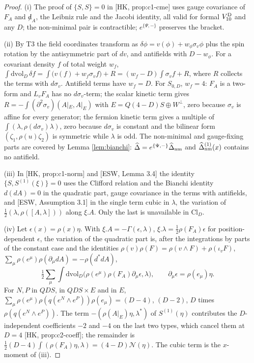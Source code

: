\begin{proof}
(i) The proof of $\{S,S\}=0$ in [HK, prop:c1-cme] uses gauge covariance of $F_A$ and ${\not d}_A$, the Leibniz rule and the Jacobi identity, all valid for formal $V^{\rm D}_{10}$ and any $D$; the non-minimal pair is contractible; $e^{\{\Psi,-\}}$ preserves the bracket.

(ii) By T3 the field coordinates transform as $\delta\phi=v(\phi)+w_\phi\sigma_v\phi$ plus the spin rotation by the antisymmetric part of $dv$, and antifields with $D-w_\phi$. For a covariant density $f$ of total weight $w_f$, $\int\mathrm{dvol}_D\,\delta f=\int\big(v(f)+w_f\sigma_vf\big)+R=(w_f-D)\int\sigma_vf+R$, where $R$ collects the terms with $d\sigma_v$. Antifield terms have $w_f=D$. For $S_{0,D}$, $w_f=4$: $F_A$ is a two-form and $L_vF_A$ has no $d\sigma_v$-term; the scalar kinetic term gives $R=-\int(\partial^2\sigma_v)(A|_E,A|_E)$ with $E=Q(4{-}D)S\oplus W^\perp$, zero because $\sigma_v$ is affine for every generator; the fermion kinetic term gives a multiple of $\int(\lambda,\rho(d\sigma_v)\lambda)$, zero because $d\sigma_v$ is constant and the bilinear form $(\zeta_1,\rho(u)\zeta_2)$ is symmetric while $\lambda$ is odd. The non-minimal and gauge-fixing parts are covered by Lemma \ref{lem:bianchi}: $\widehat\Delta=e^{\{\Psi,-\}}\widehat\Delta_{\rm nm}$ and $\widehat\Delta^{(1)}_{\rm nm}(x)$ contains no antifield.

(iii) In [HK, prop:c1-norm] and [ESW, Lemma 3.4] the identity $\{S,S^{(1)}(\xi)\}=0$ uses the Clifford relation and the Bianchi identity $d(dA)=0$ in the quadratic part, gauge covariance in the terms with antifields, and [ESW, Assumption 3.1] in the single term cubic in $\lambda$, the variation of $\frac12(\lambda,\rho([A,\lambda]))$ along $\xi.A$. Only the last is unavailable in $\mathrm{Cl}_D$.

(iv) Let $\epsilon(x)=\rho(x)\eta$. With $\xi.A=-\Gamma(\epsilon,\lambda)$, $\xi.\lambda=\frac12\rho(F_A)\epsilon$ for position-dependent $\epsilon$, the variation of the quadratic part is, after the integrations by parts of the constant case and the identities $\rho(v)\rho(F)=\rho(v\wedge F)+\rho(\iota_vF)$, $\sum_\mu\rho(e^\mu)\rho(\partial_\mu dA)=-\rho(d^*dA)$,
\[
\tfrac12\sum_\mu\int\mathrm{dvol}_D\big(\rho(e^\mu)\rho(F_A)\partial_\mu\epsilon,\lambda\big),\qquad \partial_\mu\epsilon=\rho(e_\mu)\eta .
\]
For $N,P$ in $QDS$, in $QDS\times E$ and in $E$, $\sum_\mu\rho(e^\mu)\rho(q(e^N\wedge e^P))\rho(e_\mu)=(D-4)$, $(D-2)$, $D$ times $\rho(q(e^N\wedge e^P))$. The term $-(\rho(A|_E)\eta,\lambda^*)$ of $S^{(1)}(\eta)$ contributes the $D$-independent coefficients $-2$ and $-4$ on the last two types, which cancel them at $D=4$ [HK, prop:c2-coeff]; the remainder is $\frac12(D-4)\int(\rho(F_A)\eta,\lambda)=(4-D)\mathcal N(\eta)$. The cubic term is the $x$-moment of (iii).


\end{proof}
